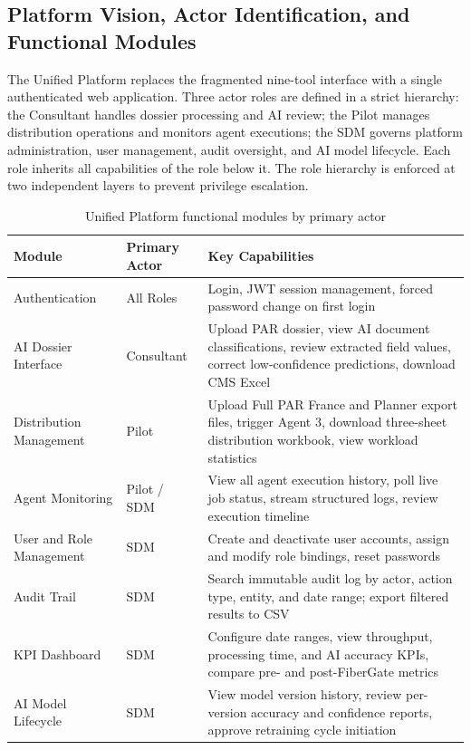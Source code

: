 \subsection{Platform Vision, Actor Identification, and Functional Modules}

The Unified Platform replaces the fragmented nine-tool interface with a single authenticated web application. Three actor roles are defined in a strict hierarchy: the Consultant handles dossier processing and AI review; the Pilot manages distribution operations and monitors agent executions; the SDM governs platform administration, user management, audit oversight, and AI model lifecycle. Each role inherits all capabilities of the role below it. The role hierarchy is enforced at two independent layers to prevent privilege escalation.

\begin{table}[H]
  \centering
  \caption{Unified Platform functional modules by primary actor}
  \renewcommand{\arraystretch}{1.0}
  \begin{tabularx}{\textwidth}{|X|X|X|}
    \hline
    \textbf{Module} & \textbf{Primary Actor} & \textbf{Key Capabilities} \\ \hline
    Authentication & All Roles & Login, JWT session management, forced password change on first login \\ \hline
    AI Dossier Interface & Consultant & Upload PAR dossier, view AI document classifications, review extracted field values, correct low-confidence predictions, download CMS Excel \\ \hline
    Distribution Management & Pilot & Upload Full PAR France and Planner export files, trigger Agent 3, download three-sheet distribution workbook, view workload statistics \\ \hline
    Agent Monitoring & Pilot / SDM & View all agent execution history, poll live job status, stream structured logs, review execution timeline \\ \hline
    User and Role Management & SDM & Create and deactivate user accounts, assign and modify role bindings, reset passwords \\ \hline
    Audit Trail & SDM & Search immutable audit log by actor, action type, entity, and date range; export filtered results to CSV \\ \hline
    KPI Dashboard & SDM & Configure date ranges, view throughput, processing time, and AI accuracy KPIs, compare pre- and post-FiberGate metrics \\ \hline
    AI Model Lifecycle & SDM & View model version history, review per-version accuracy and confidence reports, approve retraining cycle initiation \\ \hline
  \end{tabularx}
\end{table}

